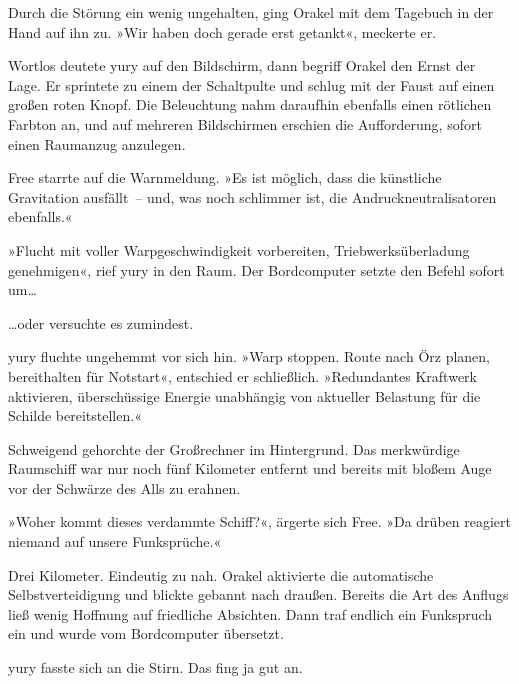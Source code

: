 Durch die Störung ein wenig ungehalten, ging Orakel mit dem Tagebuch in der Hand auf ihn zu. »Wir haben doch gerade erst getankt«, meckerte er.

Wortlos deutete yury auf den Bildschirm, dann begriff Orakel den Ernst der Lage. Er sprintete zu einem der Schaltpulte und schlug mit der Faust auf einen großen roten Knopf. Die Beleuchtung nahm daraufhin ebenfalls einen rötlichen Farbton an, und auf mehreren Bildschirmen erschien die Aufforderung, sofort einen Raumanzug anzulegen.

Free starrte auf die Warnmeldung. »Es ist möglich, dass die künstliche Gravitation ausfällt~– und, was noch schlimmer ist, die Andruckneutralisatoren ebenfalls.«

»Flucht mit voller Warpgeschwindigkeit vorbereiten, Triebwerksüberladung genehmigen«, rief yury in den Raum. Der Bordcomputer setzte den Befehl sofort um…

…oder versuchte es zumindest.


yury fluchte ungehemmt vor sich hin. »Warp stoppen. Route nach Örz planen, bereithalten für Notstart«, entschied er schließlich. »Redundantes Kraftwerk aktivieren, überschüssige Energie unabhängig von aktueller Belastung für die Schilde bereitstellen.«

Schweigend gehorchte der Großrechner im Hintergrund. Das merkwürdige Raumschiff war nur noch fünf Kilometer entfernt und bereits mit bloßem Auge vor der Schwärze des Alls zu erahnen.

»Woher kommt dieses verdammte Schiff?«, ärgerte sich Free. »Da drüben reagiert niemand auf unsere Funksprüche.«

Drei Kilometer. Eindeutig zu nah. Orakel aktivierte die automatische Selbstverteidigung und blickte gebannt nach draußen. Bereits die Art des Anflugs ließ wenig Hoffnung auf friedliche Absichten. Dann traf endlich ein Funkspruch ein und wurde vom Bordcomputer übersetzt.


yury fasste sich an die Stirn. Das fing ja gut an.


